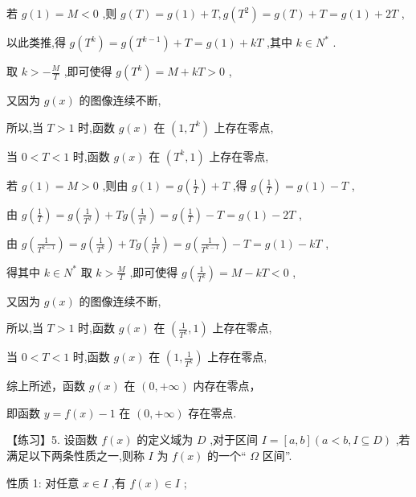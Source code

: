 \documentclass[10pt]{article}
\begin{document}
若 \(g\left( 1\right)  = M < 0\) ,则 \(g\left( T\right)  = g\left( 1\right)  + T,g\left( {T}^{2}\right)  = g\left( T\right)  + T = g\left( 1\right)  + {2T}\) ,

以此类推,得 \(g\left( {T}^{k}\right)  = g\left( {T}^{k - 1}\right)  + T = g\left( 1\right)  + {kT}\) ,其中 \(k \in  {N}^{ * }\) .

取 \(k >  - \frac{M}{T}\) ,即可使得 \(g\left( {T}^{k}\right)  = M + {kT} > 0\) ,

又因为 \(g\left( x\right)\) 的图像连续不断,

所以,当 \(T > 1\) 时,函数 \(g\left( x\right)\) 在 \(\left( {1,{T}^{k}}\right)\) 上存在零点,

当 \(0 < T < 1\) 时,函数 \(g\left( x\right)\) 在 \(\left( {{T}^{k},1}\right)\) 上存在零点,

若 \(g\left( 1\right)  = M > 0\) ,则由 \(g\left( 1\right)  = g\left( \frac{1}{T}\right)  + T\) ,得 \(g\left( \frac{1}{T}\right)  = g\left( 1\right)  - T\) ,

由 \(g\left( \frac{1}{T}\right)  = g\left( \frac{1}{{T}^{2}}\right)  + {Tg}\left( \frac{1}{{T}^{2}}\right)  = g\left( \frac{1}{T}\right)  - T = g\left( 1\right)  - {2T}\) ,

由 \(g\left( \frac{1}{{T}^{k - 1}}\right)  = g\left( \frac{1}{{T}^{k}}\right)  + {Tg}\left( \frac{1}{{T}^{k}}\right)  = g\left( \frac{1}{{T}^{k - 1}}\right)  - T = g\left( 1\right)  - {kT}\) ,

得其中 \(k \in  {N}^{ * }\) 取 \(k > \frac{M}{T}\) ,即可使得 \(g\left( \frac{1}{{T}^{k}}\right)  = M - {kT} < 0\) ,

又因为 \(g\left( x\right)\) 的图像连续不断,

所以,当 \(T > 1\) 时,函数 \(g\left( x\right)\) 在 \(\left( {\frac{1}{{T}^{k}},1}\right)\) 上存在零点,

当 \(0 < T < 1\) 时,函数 \(g\left( x\right)\) 在 \(\left( {1,\frac{1}{{T}^{k}}}\right)\) 上存在零点,

综上所述，函数 \(g\left( x\right)\) 在 \(\left( {0, + \infty }\right)\) 内存在零点，

即函数 \(y = f\left( x\right)  - 1\) 在 \(\left( {0, + \infty }\right)\) 存在零点.

【练习】5. 设函数 \(f\left( x\right)\) 的定义域为 \(D\) ,对于区间 \(I = \left\lbrack  {a,b}\right\rbrack  \left( {a < b,I \subseteq  D}\right)\) ,若满足以下两条性质之一,则称 \(I\) 为 \(f\left( x\right)\) 的一个“ \(\Omega\) 区间”.

性质 1: 对任意 \(x \in  I\) ,有 \(f\left( x\right)  \in  I\) ;
\end{document}
